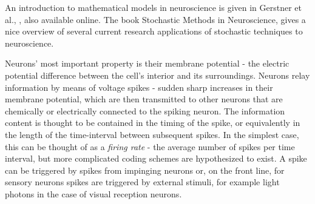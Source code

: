 An introduction to mathematical models in neuroscience is given in Gerstner et
al., \cite{Gerstner2014}, also available online. The book Stochastic Methods in
Neuroscience, \cite{Laing2009} gives a nice overview of several current research
applications of stochastic techniques to neuroscience.

Neurons' most important property is their membrane potential - the electric
potential difference between the cell's interior and its surroundings. Neurons
relay information by means of voltage spikes - sudden sharp increases in their
membrane potential, which are then transmitted to other neurons that are
chemically or electrically connected to the spiking neuron. The information
content is thought to be contained in the timing of the spike, or equivalently
in the length of the time-interval between subsequent spikes. In the simplest
case, this can be thought of as a {\sl firing rate} - the average number of
spikes per time interval, but more complicated coding schemes are hypothesized
to exist. A spike can be triggered by spikes from impinging neurons or, on the
front line, for sensory neurons spikes are triggered by external stimuli, for
example light photons in the case of visual reception neurons. 

